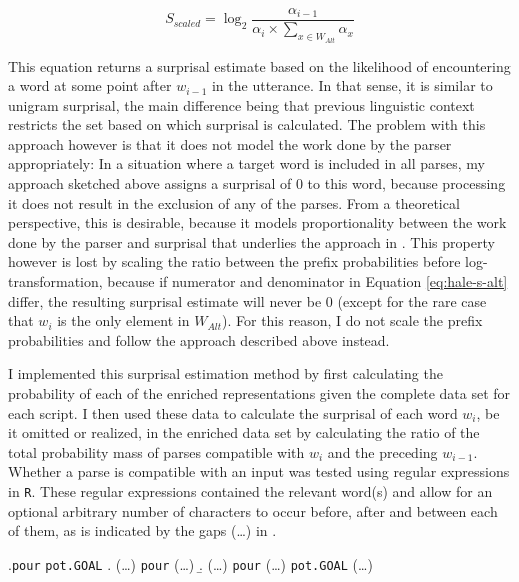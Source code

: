 \begin{equation}
\displaystyle S_{scaled} = \log_2 \frac{\alpha_{i-1}}{\alpha_i \times \sum_{x\in W_{Alt}}{\alpha_x}} \label{eq:hale-s-alt}
\end{equation}

This equation returns a surprisal estimate based on the likelihood of encountering a word at some point after $w_{i-1}$ in the utterance. In that sense, it is similar to unigram surprisal, the main difference being that previous linguistic context restricts the set based on which surprisal is calculated. The problem with this approach however is that it does not model the work done by the parser appropriately: In a situation where a target word is included in all parses, my approach sketched above assigns a surprisal of 0 to this word, because processing it does not result in the exclusion of any of the parses. From a theoretical perspective, this is desirable, because it models proportionality between the work done by the parser and surprisal that underlies the approach in \citet{hale2001}. This property however is lost by scaling the ratio between the prefix probabilities before log-transformation, because if numerator and denominator in Equation \ref{eq:hale-s-alt} differ, the resulting surprisal estimate will never be 0 (except for the rare case that $w_i$ is the only element in $W_{Alt}$). For this reason, I do not scale the prefix probabilities and follow the approach described above instead.

I implemented this surprisal estimation method by first calculating the probability of each of the enriched representations given the complete data set for each script. I then used these data to calculate the surprisal of each word $w_i$, be it omitted or realized, in the enriched data set by calculating the ratio of the total probability mass of parses compatible with $w_i$ and the preceding $w_{i-1}$. Whether a parse is compatible with an input was tested using regular expressions in \texttt{R}. These regular expressions contained the relevant word(s) and allow for an optional arbitrary number of characters to occur before, after and between each of them, as is indicated by the gaps (\dots) in \Next. %

\ex.\texttt{pour} \texttt{pot.GOAL}
\a. (\dots) \texttt{pour} (\dots)
\b. (\dots) \texttt{pour} (\dots) \texttt{pot.GOAL} (\dots)

